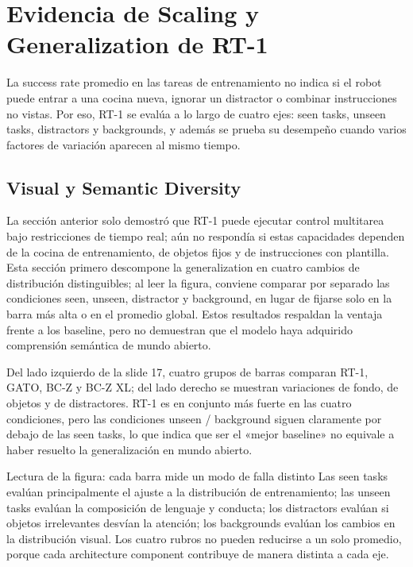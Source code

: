 \section{Evidencia de Scaling y Generalization de RT-1}

La success rate promedio en las tareas de entrenamiento no indica si el robot puede entrar a una cocina nueva, ignorar un distractor o combinar instrucciones no vistas. Por eso, RT-1 se evalúa a lo largo de cuatro ejes: seen tasks, unseen tasks, distractors y backgrounds, y además se prueba su desempeño cuando varios factores de variación aparecen al mismo tiempo.

\subsection{Visual y Semantic Diversity}

La sección anterior solo demostró que RT-1 puede ejecutar control multitarea bajo restricciones de tiempo real; aún no respondía si estas capacidades dependen de la cocina de entrenamiento, de objetos fijos y de instrucciones con plantilla. Esta sección primero descompone la generalization en cuatro cambios de distribución distinguibles; al leer la figura, conviene comparar por separado las condiciones seen, unseen, distractor y background, en lugar de fijarse solo en la barra más alta o en el promedio global. Estos resultados respaldan la ventaja frente a los baseline, pero no demuestran que el modelo haya adquirido comprensión semántica de mundo abierto.

Del lado izquierdo de la slide 17, cuatro grupos de barras comparan RT-1, GATO, BC-Z y BC-Z XL; del lado derecho se muestran variaciones de fondo, de objetos y de distractores. RT-1 es en conjunto más fuerte en las cuatro condiciones, pero las condiciones unseen / background siguen claramente por debajo de las seen tasks, lo que indica que ser el «mejor baseline» no equivale a haber resuelto la generalización en mundo abierto.


\begin{knowledgebox}{Lectura de la figura: cada barra mide un modo de falla distinto}
Las seen tasks evalúan principalmente el ajuste a la distribución de entrenamiento; las unseen tasks evalúan la composición de lenguaje y conducta; los distractors evalúan si objetos irrelevantes desvían la atención; los backgrounds evalúan los cambios en la distribución visual. Los cuatro rubros no pueden reducirse a un solo promedio, porque cada architecture component contribuye de manera distinta a cada eje.
\end{knowledgebox}

